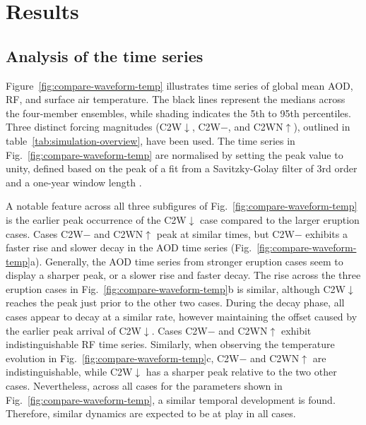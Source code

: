 \documentclass[draft]{agujournal2019}
\newcommand{\cwmp}{C2W\(-\)}
\newcommand{\cwm}{C2W\(\downarrow\)}
\newcommand{\cws}{C2WN\(\uparrow\)}
\begin{document}
\section{Results}\label{sec:results}


\subsection{Analysis of the time series}

Figure~\ref{fig:compare-waveform-temp} illustrates time series of global mean AOD,
RF, and surface air temperature. The black lines represent the medians across the
four-member ensembles, while shading indicates the 5th to 95th percentiles. Three
distinct forcing magnitudes (\cwm{}, \cwmp{}, and \cws{}), outlined in
table~\ref{tab:simulation-overview}, have been used. The time series in
Fig.~\ref{fig:compare-waveform-temp} are normalised by setting the peak value to unity,
defined based on the peak of a fit from a Savitzky-Golay filter of 3rd order and a
one-year window length \cite{savitzky1964}.

A notable feature across all three subfigures of Fig.~\ref{fig:compare-waveform-temp} is
the earlier peak occurrence of the \cwm{} case compared to the larger eruption
cases. Cases \cwmp{} and \cws{} peak at similar times, but \cwmp{} exhibits
a faster rise and slower decay in the AOD time series
(Fig.~\ref{fig:compare-waveform-temp}a). Generally, the AOD time series from
stronger eruption cases seem to display a sharper peak, or a slower rise and faster
decay. The rise across the three eruption cases in Fig.~\ref{fig:compare-waveform-temp}b
is similar, although \cwm{} reaches the peak just prior to the other two cases.
During the decay phase, all cases appear to decay at a similar rate, however maintaining
the offset caused by the earlier peak arrival of \cwm{}. Cases \cwmp{} and
\cws{} exhibit indistinguishable RF time series. Similarly, when observing the
temperature evolution in Fig.~\ref{fig:compare-waveform-temp}c, \cwmp{} and
\cws{} are indistinguishable, while \cwm{} has a sharper peak relative to the
two other cases. Nevertheless, across all cases for the parameters shown in
Fig.~\ref{fig:compare-waveform-temp}, a similar temporal development is found.
Therefore, similar dynamics are expected to be at play in all cases.
\end{document}
